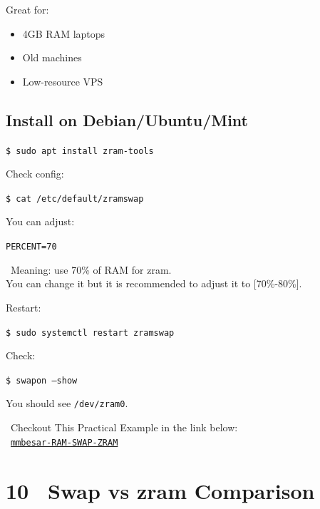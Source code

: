 \documentclass[12pt]{article}
\newcommand{\arrowicon}{\faArrowRight}
\begin{document}
Great for:

\begin{itemize}
    \item 4GB RAM laptops
    \item Old machines
    \item Low-resource VPS
\end{itemize}

\subsection*{Install on Debian/Ubuntu/Mint}

\begin{highlightbox}
\texttt{\$ sudo apt install zram-tools}
\end{highlightbox}

Check config:

\begin{highlightbox}
\texttt{\$ cat /etc/default/zramswap}
\end{highlightbox}

You can adjust:

\begin{highlightbox}
\texttt{PERCENT=70}
\end{highlightbox}

\begin{infobox}
\faInfoCircle\ Meaning: use 70\% of RAM for zram.\\
You can change it but it is recommended to adjust it to [70\%-80\%].
\end{infobox}

Restart:

\begin{highlightbox}
\texttt{\$ sudo systemctl restart zramswap}
\end{highlightbox}

Check:

\begin{highlightbox}
\texttt{\$ swapon --show}
\end{highlightbox}

You should see \texttt{/dev/zram0}.

\begin{infobox}
\faStar\ Checkout This Practical Example in the link below:\\
\arrowicon\ \href{https://mmbesar.github.io/Tutorials/RAM-SWAP-ZRAM/}{\texttt{mmbesar-RAM-SWAP-ZRAM}}
\end{infobox}

\section*{10 \faBalanceScale\ Swap vs zram Comparison}
\end{document}
